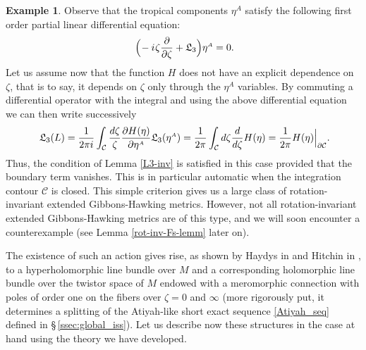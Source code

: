 \documentclass[11pt]{amsart}
\theoremstyle{remark}
\theoremstyle{remark}
\theoremstyle{definition}
\theoremstyle{definition}
\newtheorem*{example}{Example}
\theoremstyle{definition}
\newcommand{\0}{{\scriptstyle 0'}} %
\newcommand{\1}{{\scriptstyle 1'}}
\newcommand{\A}{{\scriptscriptstyle A}} %
\newcommand{\hp}{\hspace{0.5pt}} %
\begin{document}
\begin{example}
Observe that the tropical components $\eta^{\A}$ satisfy the following first order partial linear differential equation:
\begin{equation} \label{L3-rot-eta}
\Big(\! - i \hp \zeta \frac{\partial}{\partial \zeta} + \mathfrak{L}_3 \Big) \eta^{\A} = 0 \rlap{.}
\end{equation}
Let us assume now that the function $H$ does not have an explicit dependence on $\zeta$, that is to say, it depends on $\zeta$ only through the $\eta^{\A}$ variables. By commuting a differential operator with the integral and using the above differential equation we can then write successively
\begin{equation}
\mathfrak{L}_3(L) 
= \frac{1}{2\pi i} \int_{\mathcal{C}} \frac{d\zeta}{\zeta} \frac{\partial H(\eta)}{\partial \eta^{\A}} \mathfrak{L}_3(\eta^{\A})
= \frac{1}{2\pi} \int_{\mathcal{C}} d\zeta \frac{d}{d\zeta} H(\eta) = \frac{1}{2\pi} H(\eta) \Big|_{\partial\mathcal{C}} \rlap{.}
\end{equation}
Thus, the condition of Lemma \ref{L3-inv} is satisfied in this case provided that the boundary term vanishes. This is in particular automatic when the integration contour $\mathcal{C}$ is closed. This simple criterion gives us a large class of rotation-invariant extended Gibbons-Hawking metrics. However, not all rotation-invariant extended Gibbons-Hawking metrics are of this type, and we will soon encounter a counterexample (see Lemma \ref{rot-inv-Fs-lemm} later on). 
\end{example}

The existence of such an action gives rise, as shown by Haydys in \cite{MR2394039} and Hitchin in \cite{MR3116317}, to a hyperholomorphic line bundle over $M$ and a corresponding holomorphic line bundle over the twistor space of $M$ endowed with a meromorphic connection with poles of order one on the fibers over $\zeta = 0$ and $\infty$ (more rigorously put, it determines a splitting of the Atiyah-like short exact sequence \eqref{Atiyah_seq} defined in \S\,\ref{ssec:global_iss}). Let us describe now these structures in the case at hand using the theory we have developed. 
\end{document}
